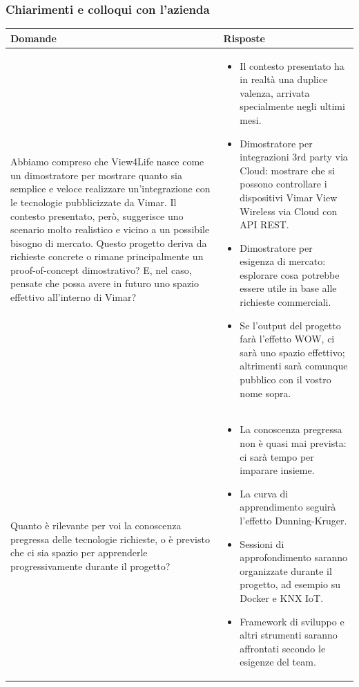 \documentclass[a4paper,11pt]{article}
\begin{document}
\subsubsection{Chiarimenti e colloqui con l'azienda}
{\footnotesize
\begin{tabularx}{\textwidth}{|>{\raggedright\arraybackslash}X|>{\raggedright\arraybackslash}X|}
\hline
\textbf{Domande} & \textbf{Risposte} \\
\hline
Abbiamo compreso che View4Life nasce come un dimostratore per mostrare quanto sia semplice e veloce realizzare un'integrazione con le tecnologie pubblicizzate da Vimar. Il contesto presentato, però, suggerisce uno scenario molto realistico e vicino a un possibile bisogno di mercato. Questo progetto deriva da richieste concrete o rimane principalmente un proof-of-concept dimostrativo? E, nel caso, pensate che possa avere in futuro uno spazio effettivo all'interno di Vimar? 
&
\begin{itemize}
\item Il contesto presentato ha in realtà una duplice valenza, arrivata specialmente negli ultimi mesi.
\item Dimostratore per integrazioni 3rd party via Cloud: mostrare che si possono controllare i dispositivi Vimar View Wireless via Cloud con API REST.
\item Dimostratore per esigenza di mercato: esplorare cosa potrebbe essere utile in base alle richieste commerciali.
\item Se l'output del progetto farà l'effetto WOW, ci sarà uno spazio effettivo; altrimenti sarà comunque pubblico con il vostro nome sopra.
\end{itemize} \\
\hline
Quanto è rilevante per voi la conoscenza pregressa delle tecnologie richieste, o è previsto che ci sia spazio per apprenderle progressivamente durante il progetto?
&
\begin{itemize}
\item La conoscenza pregressa non è quasi mai prevista: ci sarà tempo per imparare insieme.
\item La curva di apprendimento seguirà l'effetto Dunning-Kruger.
\item Sessioni di approfondimento saranno organizzate durante il progetto, ad esempio su Docker e KNX IoT.
\item Framework di sviluppo e altri strumenti saranno affrontati secondo le esigenze del team.
\end{itemize} \\

\end{tabularx}}
\end{document}

